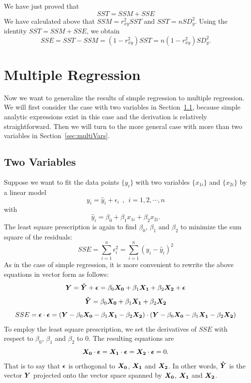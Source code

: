 \documentclass[11pt]{article}
\newcommand{\beq}{\begin{equation}}
\newcommand{\eeq}{\end{equation}}
\newcommand{\ve}[1]{\mbox{\boldmath $#1$}}
\begin{document}
We have just proved that 
\beq
  \boxed{ SST = SSM + SSE }
\label{eq:SSequality}
\eeq
We have calculated above that $SSM=r_{xy}^2 SST$ and $SST=n SD_y^2$. Using the identity $SST=SSM+SSE$, we 
obtain 
\[
  SSE = SST-SSM = (1-r_{xy}^2) SST = n (1-r_{xy}^2) SD_y^2 .
\]

\section{Multiple Regression} 

Now we want to generalize the results of simple regression to multiple regression. 
We will first consider the case with two variables in Section~\ref{sec:2vars}, 
because simple analytic expressions 
exist in this case and the derivation is relatively straightforward. 
Then we will turn to the more general case with more than two 
variables in Section~\ref{sec:multiVars}. 

\subsection{Two Variables}
\label{sec:2vars}

Suppose we want to fit the data points $\{ y_i \}$ with two variables $\{ x_{1i}\}$ and $\{ x_{2i}\}$ 
by a linear model 
\[
  y_i = \hat{y}_i + \epsilon_i  \ \ , \ \ 
i = 1,2,\cdots,n
\]
with 
\[
  \hat{y}_i = \beta_0 + \beta_1 x_{1i} + \beta_2 x_{2i} .
\]
The least square prescription is again to find $\beta_0$, $\beta_1$ and $\beta_2$ to 
minimize the sum square of the residuals: 
\[
  SSE = \sum_{i=1}^n \epsilon_i^2= \sum_{i=1}^n (y_i-\hat{y}_i)^2 
\]
As in the case of simple regression, it is more convenient to rewrite the above equations in 
vector form as follows: 
\beq
  \ve{Y} = \ve{\hat{Y}}+\ve{\epsilon} = \beta_0 \ve{X_0} + \beta_1 \ve{X_1} + \beta_2 \ve{X_2} + \ve{\epsilon}
\label{eq:Y2vars}
\eeq
\beq
  \ve{\hat{Y}}=\beta_0 \ve{X_0} + \beta_1 \ve{X_1} + \beta_2 \ve{X_2} 
\label{eq:Yhat_2vars}
\eeq
\beq
  SSE = \ve{\epsilon}\cdot \ve{\epsilon} = (\ve{Y}-\beta_0 \ve{X_0} - \beta_1 \ve{X_1} - \beta_2 \ve{X_2})\cdot 
(\ve{Y}-\beta_0 \ve{X_0} - \beta_1 \ve{X_1} - \beta_2 \ve{X_2}) 
\eeq
To employ the least square prescription, we set the derivatives of $SSE$ with respect to 
$\beta_0$, $\beta_1$ and $\beta_2$ to 0. The resulting equations are 
\beq
  \ve{X_0} \cdot \ve{\epsilon}=\ve{X_1}\cdot \ve{\epsilon} = \ve{X_2} \cdot \ve{\epsilon} = 0.
\label{eq:multiregs}
\eeq
That is to say that $\ve{\epsilon}$ is orthogonal to $\ve{X_0}$, $\ve{X_1}$ and $\ve{X_2}$. 
In other words, $\ve{\hat{Y}}$ is the vector $\ve{Y}$ projected onto the vector space spanned 
by $\ve{X_0}$, $\ve{X_1}$ and $\ve{X_2}$. 
\end{document}
